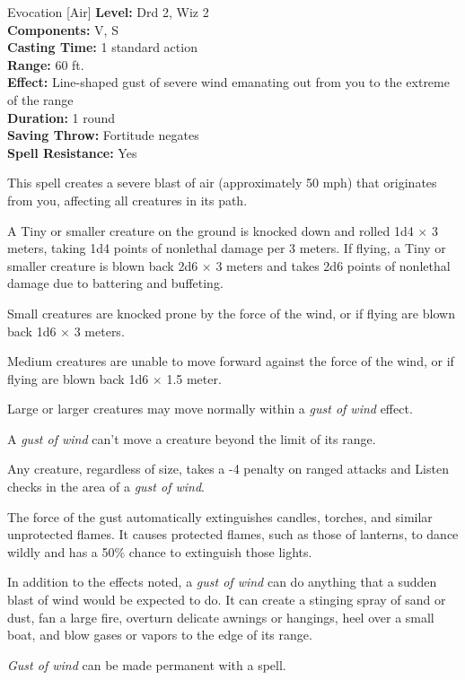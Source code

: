 {Evocation [Air]}
{
	\textbf{Level:}
	Drd 2, Wiz 2\\
	\textbf{Components:}
	V, S\\
	\textbf{Casting Time:}
	1 standard action\\
	\textbf{Range:}
	60 ft.\\
	\textbf{Effect:}
	Line-shaped gust of severe wind emanating out from you to the extreme of the range\\
	\textbf{Duration:}
	1 round\\
	\textbf{Saving Throw:}
	Fortitude negates\\
	\textbf{Spell Resistance:}
	Yes\\
}
{
	This spell creates a severe blast of air (approximately 50 mph) that originates from you, affecting all creatures in its path.

	A Tiny or smaller creature on the ground is knocked down and rolled 1d4 $\times$ 3 meters, taking 1d4 points of nonlethal damage per 3 meters. If flying, a Tiny or smaller creature is blown back 2d6 $\times$ 3 meters and takes 2d6 points of nonlethal damage due to battering and buffeting.

	Small creatures are knocked prone by the force of the wind, or if flying are blown back 1d6 $\times$ 3 meters.

	Medium creatures are unable to move forward against the force of the wind, or if flying are blown back 1d6 $\times$ 1.5 meter.

	Large or larger creatures may move normally within a \emph{gust of wind} effect.

	A \emph{gust of wind} can't move a creature beyond the limit of its range.

	Any creature, regardless of size, takes a -4 penalty on ranged attacks and Listen checks in the area of a \emph{gust of wind}.

	The force of the gust automatically extinguishes candles, torches, and similar unprotected flames. It causes protected flames, such as those of lanterns, to dance wildly and has a 50\% chance to extinguish those lights.

	In addition to the effects noted, a \emph{gust of wind} can do anything that a sudden blast of wind would be expected to do. It can create a stinging spray of sand or dust, fan a large fire, overturn delicate awnings or hangings, heel over a small boat, and blow gases or vapors to the edge of its range.

	\emph{Gust of wind} can be made permanent with a  spell.

}
